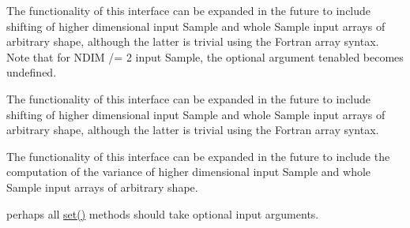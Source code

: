 \begin{DoxyRefList}
%
 The functionality of this interface can be expanded in the future to include shifting of higher dimensional input {\ttfamily Sample} and whole {\ttfamily Sample} input arrays of arbitrary shape, although the latter is trivial using the Fortran array syntax. Note that for {\ttfamily NDIM /= 2} input {\ttfamily Sample}, the optional argument {\ttfamily tenabled} becomes undefined. 
\item[Type \mbox{\hyperlink{interfaceSampleShift__mod_1_1getShifted}{Sample\+Shift\+\_\+mod\+::get\+Shifted}} ]\label{todo__todo000072}%
%
 The functionality of this interface can be expanded in the future to include shifting of higher dimensional input {\ttfamily Sample} and whole {\ttfamily Sample} input arrays of arbitrary shape, although the latter is trivial using the Fortran array syntax. 
\item[Type \mbox{\hyperlink{interfaceSampleVariance__mod_1_1genVariance}{Sample\+Variance\+\_\+mod\+::gen\+Variance}} ]\label{todo__todo000073}%
%
 The functionality of this interface can be expanded in the future to include the computation of the variance of higher dimensional input {\ttfamily Sample} and whole {\ttfamily Sample} input arrays of arbitrary shape. 
\item[Subprogram \mbox{\hyperlink{namespaceSpecBase__mod_a44ba6ab2cfcce307ab0b89dd2d4933f3}{Spec\+Base\+\_\+mod\+::set\+From\+Input\+Args}} (Spec\+Base, Err, output\+Sample\+Size, random\+Seed, description, output\+File\+Name, output\+Delimiter, output\+Chain\+File\+Format, domain\+Axes\+Name\+List, output\+Restart\+File\+Format, output\+Column\+Width, output\+Overwrite\+Enabled, output\+Real\+Precision, output\+Silent\+Mode\+Enabled, domain\+Cube\+Limit\+Lower, domain\+Cube\+Limit\+Upper, domain\+Ellipsoid\+Center, domain\+Ellipsoid\+Cov\+Mat, domain\+Ellipsoid\+Cor\+Mat, domain\+Ellipsoid\+Std\+Vec, domain, parallelism, output\+Progress\+Report\+Period, Target\+Acceptance\+Rate, parallelism\+Mpi\+Finalize\+Enabled, domain\+Max\+Num\+Check\+To\+Warn, domain\+Max\+Num\+Check\+To\+Stop)]\label{todo__todo000074}%
%
perhaps all {\ttfamily \mbox{\hyperlink{namespaceSpecBase__Description__mod_a8370203dcfcccf9e565eb93fa3674075}{set()}}} methods should take optional input arguments.  
\item[Subprogram \mbox{\hyperlink{namespaceStatistics__mod_a1fd519cf4d71eb72a8b096f60398b46f}{Statistics\+\_\+mod\+::get\+Beta\+CDF\+\_\+\+RK32}} (alpha, beta, x)]\label{todo__todo000075}%

\end{DoxyRefList}
